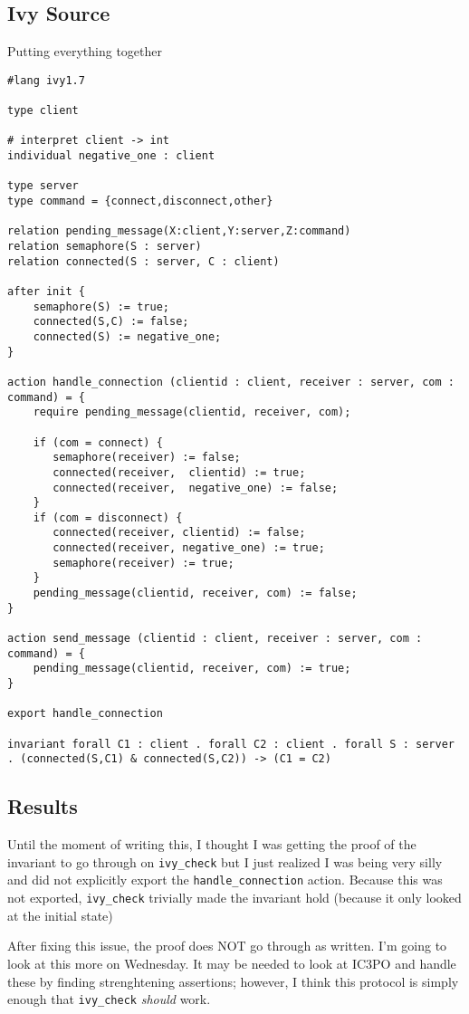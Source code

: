 \documentclass[11pt]{article}
\begin{document}
\subsection{Ivy Source}
\label{sec:org69d9157}
Putting everything together
\begin{verbatim}
#lang ivy1.7

type client

# interpret client -> int
individual negative_one : client

type server
type command = {connect,disconnect,other}

relation pending_message(X:client,Y:server,Z:command)
relation semaphore(S : server)
relation connected(S : server, C : client)

after init {
    semaphore(S) := true;
    connected(S,C) := false;
    connected(S) := negative_one;
}

action handle_connection (clientid : client, receiver : server, com : command) = {
    require pending_message(clientid, receiver, com);

    if (com = connect) {
       semaphore(receiver) := false;
       connected(receiver,  clientid) := true;
       connected(receiver,  negative_one) := false;
    }
    if (com = disconnect) {
       connected(receiver, clientid) := false;
       connected(receiver, negative_one) := true;
       semaphore(receiver) := true;
    }
    pending_message(clientid, receiver, com) := false;
}

action send_message (clientid : client, receiver : server, com : command) = {
    pending_message(clientid, receiver, com) := true;
}

export handle_connection

invariant forall C1 : client . forall C2 : client . forall S : server . (connected(S,C1) & connected(S,C2)) -> (C1 = C2)
\end{verbatim}
\subsection{Results}
\label{sec:org3f5ce3a}
Until the moment of writing this, I thought I was getting the proof of the invariant to go through on \texttt{ivy\_check} but I just realized I was being very silly and did not explicitly export the \texttt{handle\_connection} action. Because this was not exported, \texttt{ivy\_check} trivially made the invariant hold (because it only looked at the initial state)

After fixing this issue, the proof does NOT go through as written. I'm going to look at this more on Wednesday. It may be needed to look at IC3PO and handle these by finding strenghtening assertions; however, I think this protocol is simply enough that \texttt{ivy\_check} \emph{should} work.
\end{document}
